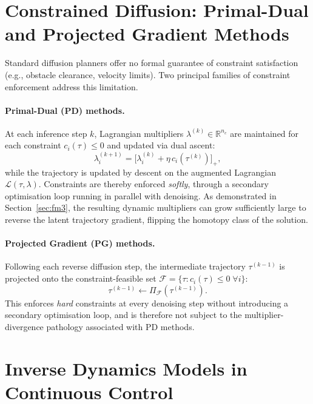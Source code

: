 \documentclass[12pt, a4paper, oneside]{report}
\theoremstyle{definition}
\newcommand{\R}{\mathbb{R}}
\begin{document}
\section{Constrained Diffusion: Primal-Dual and Projected Gradient
Methods}
\label{sec:bg_constrained}

Standard diffusion planners offer no formal guarantee of constraint
satisfaction (e.g., obstacle clearance, velocity limits). Two
principal families of constraint enforcement address this
limitation.

\paragraph{Primal-Dual (PD) methods.}
At each inference step $k$, Lagrangian multipliers
$\lambda^{(k)} \in \R^{n_c}$ are maintained for each constraint
$c_i(\tau) \leq 0$ and updated via dual ascent:
\begin{equation}
  \lambda^{(k+1)}_i = \bigl[\lambda^{(k)}_i +
    \eta \, c_i(\tau^{(k)})\bigr]_+,
  \label{eq:pd_update_main}
\end{equation}
while the trajectory is updated by descent on the augmented
Lagrangian $\mathcal{L}(\tau, \lambda)$. Constraints are thereby
enforced \emph{softly}, through a secondary optimisation loop
running in parallel with denoising. As demonstrated in
Section~\ref{sec:fm3}, the resulting dynamic multipliers can grow
sufficiently large to reverse the latent trajectory gradient,
flipping the homotopy class of the solution.

\paragraph{Projected Gradient (PG) methods.}
Following each reverse diffusion step, the intermediate trajectory
$\tau^{(k-1)}$ is projected onto the constraint-feasible set
$\mathcal{F} = \{\tau : c_i(\tau) \leq 0 \; \forall i\}$:
\begin{equation}
  \tau^{(k-1)} \gets \Pi_{\mathcal{F}}(\tau^{(k-1)}).
  \label{eq:pg_proj}
\end{equation}
This enforces \emph{hard} constraints at every denoising step
without introducing a secondary optimisation loop, and is therefore
not subject to the multiplier-divergence pathology associated with
PD methods.

\section{Inverse Dynamics Models in Continuous Control}
\label{sec:bg_idm}
\end{document}
